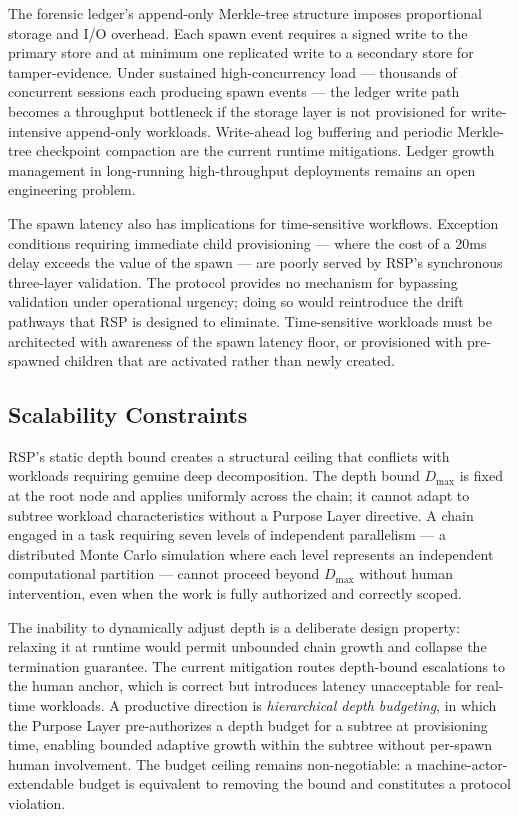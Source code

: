 The forensic ledger's append-only Merkle-tree structure imposes proportional storage and I/O overhead. Each spawn event requires a signed write to the primary store and at minimum one replicated write to a secondary store for tamper-evidence. Under sustained high-concurrency load — thousands of concurrent sessions each producing spawn events — the ledger write path becomes a throughput bottleneck if the storage layer is not provisioned for write-intensive append-only workloads. Write-ahead log buffering and periodic Merkle-tree checkpoint compaction are the current runtime mitigations. Ledger growth management in long-running high-throughput deployments remains an open engineering problem.

The spawn latency also has implications for time-sensitive workflows. Exception conditions requiring immediate child provisioning — where the cost of a 20ms delay exceeds the value of the spawn — are poorly served by RSP's synchronous three-layer validation. The protocol provides no mechanism for bypassing validation under operational urgency; doing so would reintroduce the drift pathways that RSP is designed to eliminate. Time-sensitive workloads must be architected with awareness of the spawn latency floor, or provisioned with pre-spawned children that are activated rather than newly created.

\subsection{Scalability Constraints}
\label{sec:rs-scalability}

RSP's static depth bound creates a structural ceiling that conflicts with workloads requiring genuine deep decomposition. The depth bound $D_{\max}$ is fixed at the root node and applies uniformly across the chain; it cannot adapt to subtree workload characteristics without a Purpose Layer directive. A chain engaged in a task requiring seven levels of independent parallelism — a distributed Monte Carlo simulation where each level represents an independent computational partition — cannot proceed beyond $D_{\max}$ without human intervention, even when the work is fully authorized and correctly scoped.

The inability to dynamically adjust depth is a deliberate design property: relaxing it at runtime would permit unbounded chain growth and collapse the termination guarantee. The current mitigation routes depth-bound escalations to the human anchor, which is correct but introduces latency unacceptable for real-time workloads. A productive direction is \emph{hierarchical depth budgeting}, in which the Purpose Layer pre-authorizes a depth budget for a subtree at provisioning time, enabling bounded adaptive growth within the subtree without per-spawn human involvement. The budget ceiling remains non-negotiable: a machine-actor-extendable budget is equivalent to removing the bound and constitutes a protocol violation.

